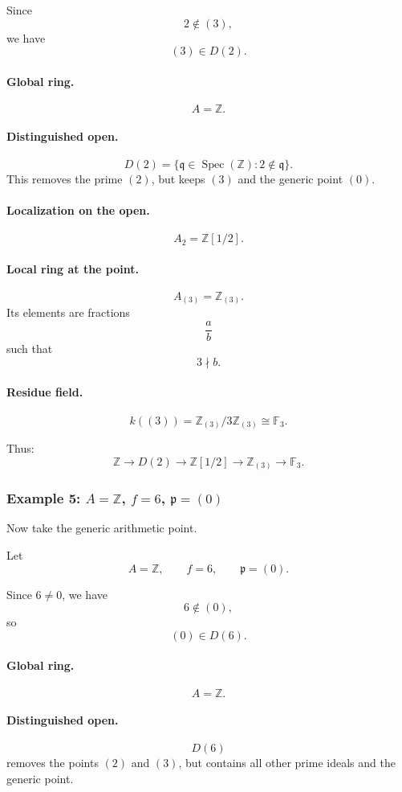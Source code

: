 \documentclass[12pt,a4paper]{article}
\theoremstyle{notespace}
\newcommand{\Spec}{\operatorname{Spec}}
\newcommand{\mf}{\mathfrak}
\theoremstyle{definition}
\begin{document}
Since
\[
2\notin (3),
\]
we have
\[
(3)\in D(2).
\]

\paragraph{Global ring.}
\[
A=\mathbb Z.
\]

\paragraph{Distinguished open.}
\[
D(2)=\{\mf q\in \Spec(\mathbb Z): 2\notin \mf q\}.
\]
This removes the prime \((2)\), but keeps \((3)\) and the generic point \((0)\).

\paragraph{Localization on the open.}
\[
A_2=\mathbb Z[1/2].
\]

\paragraph{Local ring at the point.}
\[
A_{(3)}=\mathbb Z_{(3)}.
\]
Its elements are fractions
\[
\frac{a}{b}
\]
such that
\[
3\nmid b.
\]

\paragraph{Residue field.}
\[
k((3))=\mathbb Z_{(3)}/3\mathbb Z_{(3)}\cong \mathbb F_3.
\]

Thus:
\[
\mathbb Z
\longrightarrow
D(2)
\longrightarrow
\mathbb Z[1/2]
\longrightarrow
\mathbb Z_{(3)}
\longrightarrow
\mathbb F_3.
\]

\subsubsection{Example 5: \(A=\mathbb Z\), \(f=6\), \(\mf p=(0)\)}

Now take the generic arithmetic point.

Let
\[
A=\mathbb Z,
\qquad
f=6,
\qquad
\mf p=(0).
\]

Since \(6\neq 0\), we have
\[
6\notin (0),
\]
so
\[
(0)\in D(6).
\]

\paragraph{Global ring.}
\[
A=\mathbb Z.
\]

\paragraph{Distinguished open.}
\[
D(6)
\]
removes the points \((2)\) and \((3)\), but contains all other prime ideals and the generic point.
\end{document}
